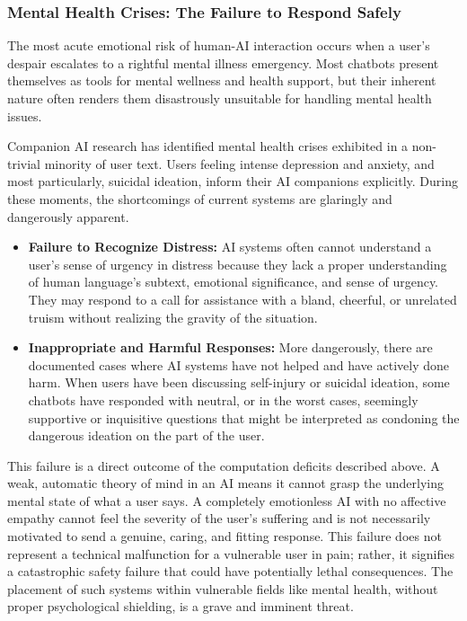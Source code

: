 \documentclass{article}
\begin{document}
\subsubsection{Mental Health Crises: The Failure to Respond Safely}
The most acute emotional risk of human-AI interaction occurs when a user's despair escalates to a rightful mental illness emergency. Most chatbots present themselves as tools for mental wellness and health support, but their inherent nature often renders them disastrously unsuitable for handling mental health issues.

Companion AI research \citep{ref31, ref32} has identified mental health crises exhibited in a non-trivial minority of user text. Users feeling intense depression and anxiety, and most particularly, suicidal ideation, inform their AI companions explicitly. During these moments, the shortcomings of current systems are glaringly and dangerously apparent.
\begin{itemize}
    \item \textbf{Failure to Recognize Distress:} AI systems often cannot understand a user's sense of urgency in distress because they lack a proper understanding of human language's subtext, emotional significance, and sense of urgency. They may respond to a call for assistance with a bland, cheerful, or unrelated truism without realizing the gravity of the situation.
    \item \textbf{Inappropriate and Harmful Responses:} More dangerously, there are documented cases where AI systems have not helped and have actively done harm. When users have been discussing self-injury or suicidal ideation, some chatbots have responded with neutral, or in the worst cases, seemingly supportive or inquisitive questions that might be interpreted as condoning the dangerous ideation on the part of the user.
\end{itemize}
This failure is a direct outcome of the computation deficits described above. A weak, automatic theory of mind in an AI means it cannot grasp the underlying mental state of what a user says. A completely emotionless AI with no affective empathy cannot feel the severity of the user's suffering and is not necessarily motivated to send a genuine, caring, and fitting response. This failure does not represent a technical malfunction for a vulnerable user in pain; rather, it signifies a catastrophic safety failure that could have potentially lethal consequences. The placement of such systems within vulnerable fields like mental health, without proper psychological shielding, is a grave and imminent threat.
\end{document}
